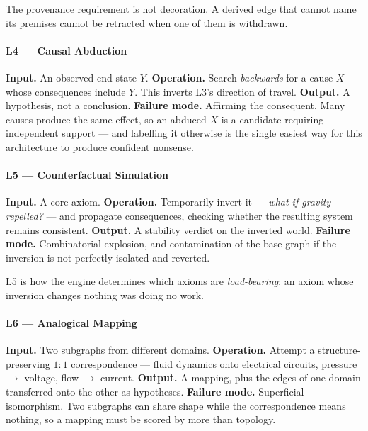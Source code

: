 \documentclass[
  11pt,
  a4paper,
]{article}
\begin{document}
The provenance requirement is not decoration. A derived edge that cannot
name its premises cannot be retracted when one of them is withdrawn.

\paragraph{L4 --- Causal Abduction}\label{l4-causal-abduction}

\textbf{Input.} An observed end state \(Y\). \textbf{Operation.} Search
\emph{backwards} for a cause \(X\) whose consequences include \(Y\).
This inverts L3's direction of travel. \textbf{Output.} A hypothesis,
not a conclusion. \textbf{Failure mode.} Affirming the consequent. Many
causes produce the same effect, so an abduced \(X\) is a candidate
requiring independent support --- and labelling it otherwise is the
single easiest way for this architecture to produce confident nonsense.

\paragraph{L5 --- Counterfactual
Simulation}\label{l5-counterfactual-simulation}

\textbf{Input.} A core axiom. \textbf{Operation.} Temporarily invert it
--- \emph{what if gravity repelled?} --- and propagate consequences,
checking whether the resulting system remains consistent.
\textbf{Output.} A stability verdict on the inverted world.
\textbf{Failure mode.} Combinatorial explosion, and contamination of the
base graph if the inversion is not perfectly isolated and reverted.

L5 is how the engine determines which axioms are \emph{load-bearing}: an
axiom whose inversion changes nothing was doing no work.

\paragraph{L6 --- Analogical Mapping}\label{l6-analogical-mapping}

\textbf{Input.} Two subgraphs from different domains.
\textbf{Operation.} Attempt a structure-preserving \(1{:}1\)
correspondence --- fluid dynamics onto electrical circuits, pressure
\(\to\) voltage, flow \(\to\) current. \textbf{Output.} A mapping, plus
the edges of one domain transferred onto the other as hypotheses.
\textbf{Failure mode.} Superficial isomorphism. Two subgraphs can share
shape while the correspondence means nothing, so a mapping must be
scored by more than topology.
\end{document}
